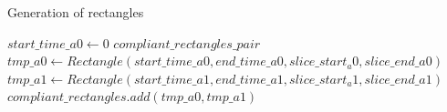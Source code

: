 \documentclass[11pt,a4paper]{article}
\begin{document}
\begin{algorithm}
\caption{Generation of rectangles}\label{rectangles_precomputation}
\begin{algorithmic}[1]
	\State $start\_time\_a0 \gets 0$
	\State $compliant\_rectangles\_pair$
				\State $tmp\_a0 \gets Rectangle(start\_time\_a0, end\_time\_a0,slice\_start_a0,slice\_end\_a0)$
							\State $tmp\_a1 \gets Rectangle(start\_time\_a1, end\_time\_a1,slice\_start_a1,slice\_end\_a1)$
								\State $compliant\_rectangles.add(tmp\_a0, tmp\_a1)$
							\EndIf
						\EndFor
					\EndFor		
				\EndFor
			\EndFor
		\EndFor		
	\EndFor
\EndProcedure
\end{algorithmic}
\end{algorithm}
\end{document}
